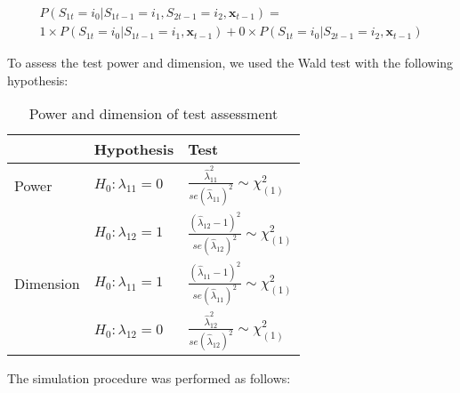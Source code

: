\begin{multline} 
P(S_{1t} =  i_0 | S_{1t-1} = i_1, S_{2t-1} = i_2, \boldsymbol{x}_{t-1}) = \\
1 \times P(S_{1t} =  i_0 | S_{1t-1} = i_1,\boldsymbol{x}_{t-1}) +  0 \times P(S_{1t} =  i_0 | S_{2t-1} = i_2, \boldsymbol{x}_{t-1}) \label{eq:eq11}
\end{multline}

To assess the test power and dimension, we used the Wald test with the following hypothesis:

\begin{table}

\caption{\label{tab:dim-pow-tex}Power and dimension of test assessment}
\centering
\begin{tabular}[t]{l|l|l}
\hline
 & Hypothesis & Test\\
\hline
Power & $H_0: \lambda_{11} = 0$ & $\frac{\widehat{\lambda}_{11}^2}{se(\widehat{\lambda}_{11})^2} \sim \chi^2_{(1)}$\\
\hline
 & $H_0: \lambda_{12} = 1$ & $\frac{(\widehat{\lambda}_{12}-1)^2}{se(\widehat{\lambda}_{12})^2} \sim \chi^2_{(1)}$\\
\hline
Dimension & $H_0: \lambda_{11} = 1$ & $\frac{(\widehat{\lambda}_{11}-1)^2}{se(\widehat{\lambda}_{11})^2} \sim \chi^2_{(1)}$\\
\hline
 & $H_0: \lambda_{12} = 0$ & $\frac{\widehat{\lambda}_{12}^2}{se(\widehat{\lambda}_{12})^2} \sim \chi^2_{(1)}$\\
\hline
\end{tabular}
\end{table}

The simulation procedure was performed as follows:

